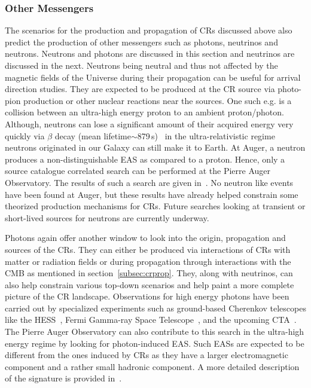 \subsubsection*{Other Messengers}
\label{subsubsec:CRmessengers}
The scenarios for the production and propagation of \glspl{CR} discussed above also predict the production of other messengers such as photons, neutrinos and neutrons. Neutrons and photons are discussed in this section and neutrinos are discussed in the next. 
Neutrons being neutral and thus not affected by the magnetic fields of the Universe during their propagation can be useful for arrival direction studies. They are expected to be produced at the CR source via photo-pion production or other nuclear reactions near the sources. One such e.g. is a collision between an ultra-high energy proton to an ambient proton/photon. Although, neutrons can lose a significant amount of their acquired energy very quickly via $\beta$ decay (mean lifetime$\sim$879\,s)~\cite{ParticleDataGroup:2024cfk} in the ultra-relativistic regime neutrons originated in our Galaxy can still make it to Earth. At Auger, a neutron produces a non-distinguishable EAS as compared to a proton. Hence, only a source catalogue correlated search can be performed at the Pierre Auger Observatory. The results of such a search are given in~\cite{PierreAuger:2023onx}. No neutron like events have been found at Auger, but these results have already helped constrain some theorized production mechanisms for \glspl{CR}. Future searches looking at transient or short-lived sources for neutrons are currently underway. 

Photons again offer another window to look into the origin, propagation and sources of the \glspl*{CR}. They can either be produced via interactions of \glspl*{CR} with matter or radiation fields or during propagation through interactions with the \gls*{CMB} as mentioned in section~\ref{subsec:crprop}. They, along with neutrinos, can also help constrain various top-down scenarios and help paint a more complete picture of the CR landscape. Observations for high energy photons have been carried out by specialized experiments such as ground-based Cherenkov telescopes like the \gls{HESS}~\cite{Puhlhofer:2024fjx}, Fermi Gamma-ray Space Telescope~\cite{Thompson_2022}, and the upcoming \gls{CTA}~\cite{2018_CTAO}. The Pierre Auger Observatory can also contribute to this search in the ultra-high energy regime by looking for photon-induced EAS. Such EASs are expected to be different from the ones induced by \glspl{CR} as they have a larger electromagnetic component and a rather small hadronic component. A more detailed description of the signature is provided in~\cite{universe8110579}. 

